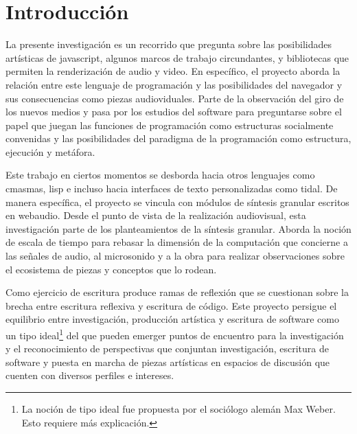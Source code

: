 \chapter{Introducción}


La presente investigación es un recorrido que pregunta sobre las posibilidades artísticas de \Gls{javascript}, algunos marcos de trabajo circundantes, y bibliotecas que permiten la renderización de audio y video. En específico, el proyecto aborda la relación entre este lenguaje de programación y las posibilidades del \Gls{navegador} y sus consecuencias como piezas audioviduales. Parte de la observación del giro de los nuevos medios y pasa por los estudios del software \citep{manovichlanguage} para preguntarse sobre el papel que juegan las funciones de programación como estructuras socialmente convenidas y las posibilidades del paradigma de la programación como estructura, ejecución y metáfora. 



Este trabajo en ciertos momentos se desborda hacia otros lenguajes como \Gls{cmasmas}, \Gls{lisp} e incluso hacia interfaces de texto personalizadas como \Gls{tidal}. De manera específica, el proyecto se vincula con módulos de síntesis granular escritos en \Gls{webaudio}. Desde el punto de vista de la realización audiovisual, esta investigación parte de los planteamientos de la síntesis granular. Aborda la noción de escala de tiempo \citep{microsound} para rebasar la dimensión de la computación que concierne a las señales de audio, al microsonido y a la obra para realizar observaciones sobre el ecosistema de piezas y conceptos que lo rodean. 


Como ejercicio de escritura produce ramas de reflexión que se cuestionan sobre la brecha entre escritura reflexiva y escritura de código. Este proyecto persigue el equilibrio entre investigación, producción artística y escritura de software como un tipo ideal\footnote{La noción de tipo ideal fue propuesta por el sociólogo alemán Max Weber. Esto requiere más explicación.} del que pueden emerger puntos de encuentro para la investigación \citep{shankenCanon} y el reconocimiento de perspectivas que conjuntan investigación, escritura de software y puesta en marcha de piezas artísticas en espacios de discusión que cuenten con diversos perfiles e intereses.

